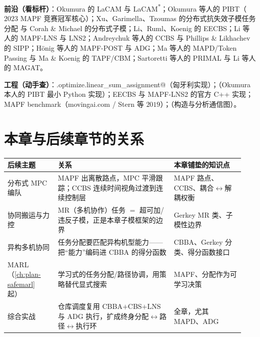 \textbf{前沿（看标杆）}：Okumura 的 LaCAM\cite{okumura2023lacam} 与 LaCAM\textsuperscript{*}\cite{okumura2023lacamstar}；Okumura 等人的 PIBT\cite{okumura2022pibt}（$2023$ MAPF 竞赛冠军核心）；Xu、Garimella、Tzoumas 的分布式抗失效子模任务分配\cite{xu2025distributed} 与 Corah \& Michael 的分布式子模\cite{corah2019distributed}；Li、Ruml、Koenig 的 EECBS\cite{li2021eecbs}；Li 等人的 MAPF-LNS\cite{li2021lns} 与 LNS2\cite{li2022lns2}；Andreychuk 等人的 CCBS\cite{andreychuk2022ccbs} 与 Phillips \& Likhachev 的 SIPP\cite{phillips2011sipp}；H\"onig 等人的 MAPF-POST\cite{honig2016mapfpost} 与 ADG\cite{honig2019persistent}；Ma 等人的 MAPD/Token Passing\cite{ma2017lifelong} 与 Ma \& Koenig 的 TAPF/CBM\cite{ma2016optimal}；Sartoretti 等人的 PRIMAL\cite{sartoretti2019primal} 与 Li 等人的 MAGAT\cite{li2021magat}。

\textbf{工程（动手查）}：\verb@scipy.optimize.linear_sum_assignment@（匈牙利实现）；\verb@pypibt@（Okumura 本人的 PIBT 最小 Python 实现）；EECBS 与 MAPF-LNS2 的官方 C++ 实现；MAPF benchmark（movingai.com / Stern 等 $2019$）；\verb@networkx@（构造与分析通信图）。

\section{本章与后续章节的关系}
\label{sec:mapf-next}

\begin{table}[H]\centering\small
\begin{tabular}{p{0.20\linewidth}p{0.46\linewidth}p{0.28\linewidth}}
\toprule
后续主题 & 关系 & 本章铺垫的知识点 \\
\midrule
分布式 MPC 编队 & MAPF 出离散路点，MPC 平滑跟踪；CCBS 连续时间视角过渡到连续控制层 & MAPF 路点、CCBS、耦合$\leftrightarrow$解耦权衡 \\
协同搬运与力控 & MR（多机协作）任务 $=$ 超可加/违反子模，正是本章子模框架的边界 & Gerkey MR 类、子模性边界 \\
异构多机协同 & 任务分配要匹配异构机型能力——把“能力”编码进 CBBA 的得分函数 & CBBA、Gerkey 分类、得分函数接口 \\
MARL（\cref{ch:plan-safemarl} 起） & 学习式的任务分配/路径协调，用策略替代显式搜索 & MAPF、分配作为可学习决策 \\
综合实战 & 仓库调度复用 CBBA$+$CBS$+$LNS 与 ADG 执行，扩成终身分配$\leftrightarrow$路径$\leftrightarrow$执行环 & 全章，尤其 MAPD、ADG \\
\bottomrule
\end{tabular}
\end{table}

